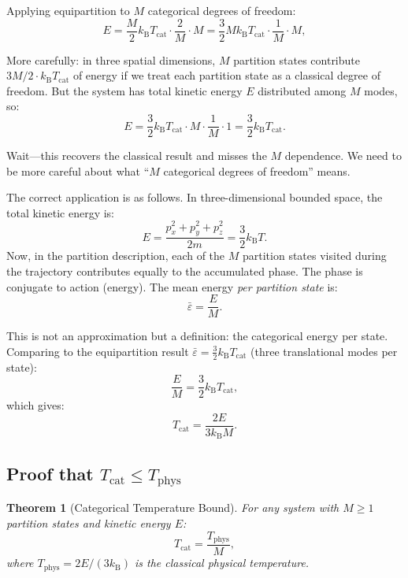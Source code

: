 \documentclass[twocolumn,10pt]{article}
\newtheorem{theorem}{Theorem}[section]
\newcommand{\kB}{k_{\mathrm{B}}}
\newcommand{\Tcat}{T_{\mathrm{cat}}}
\newcommand{\Tphys}{T_{\mathrm{phys}}}
\begin{document}
Applying equipartition to $M$ categorical degrees of freedom:
\begin{equation}
    E = \frac{M}{2} \kB \Tcat \cdot \frac{2}{M} \cdot M = \frac{3}{2} M \kB \Tcat \cdot \frac{1}{M} \cdot M,
\end{equation}

More carefully: in three spatial dimensions, $M$ partition states contribute $3M/2 \cdot \kB \Tcat$ of energy if we treat each partition state as a classical degree of freedom. But the system has total kinetic energy $E$ distributed among $M$ modes, so:
\begin{equation}
    E = \frac{3}{2} \kB \Tcat \cdot M \cdot \frac{1}{M} \cdot 1 = \frac{3}{2} \kB \Tcat.
\end{equation}

Wait---this recovers the classical result and misses the $M$ dependence. We need to be more careful about what ``$M$ categorical degrees of freedom'' means.

The correct application is as follows. In three-dimensional bounded space, the total kinetic energy is:
\begin{equation}
    E = \frac{p_x^2 + p_y^2 + p_z^2}{2m} = \frac{3}{2}\kB T.
\end{equation}
Now, in the partition description, each of the $M$ partition states visited during the trajectory contributes equally to the accumulated phase. The phase is conjugate to action (energy). The mean energy \emph{per partition state} is:
\begin{equation}
    \bar{\varepsilon} = \frac{E}{M}.
\end{equation}

This is not an approximation but a definition: the categorical energy per state. Comparing to the equipartition result $\bar{\varepsilon} = \frac{3}{2}\kB \Tcat$ (three translational modes per state):
\begin{equation}
    \frac{E}{M} = \frac{3}{2}\kB \Tcat,
\end{equation}
which gives:
\begin{equation}
    \boxed{\Tcat = \frac{2E}{3\kB M}.}
    \label{eq:Tcat}
\end{equation}

\subsection{Proof that $\Tcat \leq \Tphys$}

\begin{theorem}[Categorical Temperature Bound]
\label{thm:Tbound}
For any system with $M \geq 1$ partition states and kinetic energy $E$:
\begin{equation}
    \Tcat = \frac{\Tphys}{M},
    \label{eq:Tbound}
\end{equation}
where $\Tphys = 2E/(3\kB)$ is the classical physical temperature.
\end{theorem}
\end{document}
